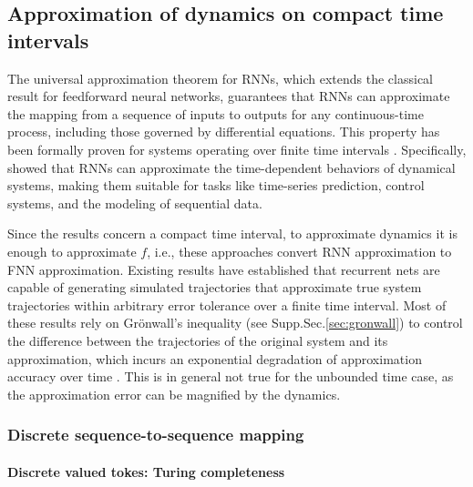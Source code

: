 \documentclass{article}
\theoremstyle{definition} \newtheorem{definition}{Definition}
\theoremstyle{remark} \newtheorem{remark}{Remark}
\newcounter{ct}
\begin{document}
\subsection{Approximation of dynamics on compact time intervals}\label{sec:compacttime}
The universal approximation theorem for RNNs, which extends the classical result for feedforward neural networks, guarantees that RNNs can approximate the mapping from a sequence of inputs to outputs for any continuous-time process, including those governed by differential equations.
%
This property has been formally proven for systems operating over finite time intervals \citep{li1992approximation}. %
Specifically, \citet{funahashi1993approximation} showed that RNNs can approximate the time-dependent behaviors of dynamical systems, making them suitable for tasks like time-series prediction, control systems, and the modeling of sequential data.

Since the results concern a compact time interval, to approximate dynamics it is enough to approximate $f$, i.e., these approaches convert RNN approximation to FNN approximation.
Existing results have established that recurrent nets are capable of generating simulated trajectories that approximate true system trajectories within arbitrary error tolerance over a finite time interval.
Most of these results rely on Gr\"{o}nwall’s inequality (see Supp.Sec.\ref{sec:gronwall}) to control the difference between the trajectories of the original system and its approximation, which incurs an exponential degradation of approximation accuracy over time
\citep{sontag1992neural, sontag1998learning, funahashi1993approximation, chow2000modeling, li2005approximation}.
This is in general not true for the unbounded time case, as the approximation error can be magnified by the dynamics.


\subsubsection{Discrete sequence-to-sequence mapping}\label{sec:discrete}
\paragraph{Discrete valued tokes: Turing completeness}
\end{document}
